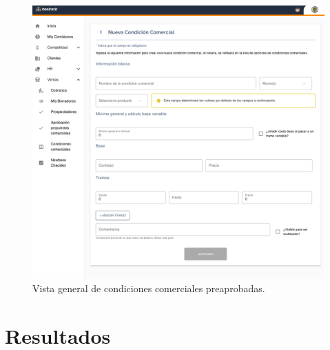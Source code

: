     \begin{figure}[H]
      \centering
      \includegraphics[width=0.6\linewidth]{figures/cc/vistas/cc_new_manager.png}
      \caption{Vista general de condiciones comerciales preaprobadas.}
      \label{fig:cc_new_manager}
    \end{figure}



\section{Resultados}